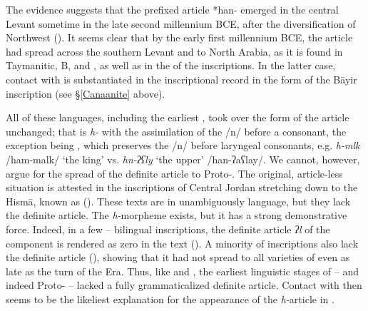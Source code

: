 \documentclass[output=paper]{langsci/langscibook}
\begin{document}
The evidence suggests that the prefixed {article} *han- emerged in the central Levant sometime in the late second millennium BCE, after the diversification of Northwest  (\citealt{Tropper2001,Gzella2006,Pat-El2006}). It seems clear that by the early first millennium BCE, the {article} had spread across the southern Levant and to North Arabia, as it is found in Taymanitic,  B, and , as well as in the   of the  inscriptions. In the latter case, contact with  is substantiated in the inscriptional record in the form of the Bāyir inscription (see §\ref{Canaanite} above). 

All of these languages, including the earliest  , took over the form of the {article} unchanged; that is \textit{h-} with the assimilation of the /n/ before a consonant, the exception being , which preserves the /n/ before laryngeal consonants, e.g. \textit{h-mlk} /ham-malk/ ‘the king’ vs. \textit{hn-ʔʕly} ‘the upper’ /han-ʔaʕlay/. We cannot, however, argue for the spread of the {definite} {article} to Proto-. The original, article-less situation is attested in the inscriptions of Central Jordan stretching down to the Hismā, known as  (\citealt{GrafZwettler2004}). These texts are in unambiguously  language, but they lack the {definite} {article}. The \textit{h-}morpheme exists, but it has a strong demonstrative force. Indeed, in a few -- bilingual inscriptions, the {definite} {article} \textit{ʔl} of the  component is rendered as zero in the  text (\citealt{Hayajneh2009}). A minority of  inscriptions also lack the {definite} {article} (\citealt{Al-Jallad2018ANA}), showing that it had not spread to all varieties of  even as late as the turn of the Era. Thus, like  and , the earliest linguistic stages of  – and indeed Proto- – lacked a fully grammaticalized {definite} {article}. Contact with  then seems to be the likeliest explanation for the appearance of the \textit{h-}{article} in  .
\end{document}
